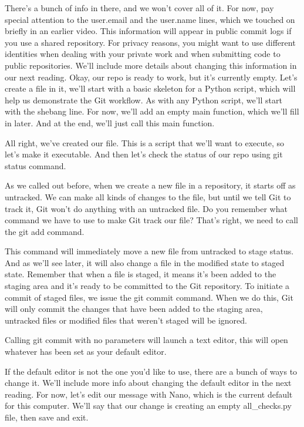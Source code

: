 	There's a bunch of info in there, and we won't cover all of it. For now, pay special attention to the user.email and the user.name lines, which we touched on briefly in an earlier video. This information will appear in public commit logs if you use a shared repository. For privacy reasons, you might want to use different identities when dealing with your private work and when submitting code to public repositories. We'll include more details about changing this information in our next reading. Okay, our repo is ready to work, but it's currently empty. Let's create a file in it, we'll start with a basic skeleton for a Python script, which will help us demonstrate the Git workflow. As with any Python script, we'll start with the shebang line. For now, we'll add an empty main function, which we'll fill in later. And at the end, we'll just call this main function.
	
	All right, we've created our file. This is a script that we'll want to execute, so let's make it executable. And then let's check the status of our repo using git status command.
	
	As we called out before, when we create a new file in a repository, it starts off as untracked. We can make all kinds of changes to the file, but until we tell Git to track it, Git won't do anything with an untracked file. Do you remember what command we have to use to make Git track our file? That's right, we need to call the git add command.
	
	This command will immediately move a new file from untracked to stage status. And as we'll see later, it will also change a file in the modified state to staged state. Remember that when a file is staged, it means it's been added to the staging area and it's ready to be committed to the Git repository. To initiate a commit of staged files, we issue the git commit command. When we do this, Git will only commit the changes that have been added to the staging area, untracked files or modified files that weren't staged will be ignored.
	
	Calling git commit with no parameters will launch a text editor, this will open whatever has been set as your default editor.
	
	If the default editor is not the one you'd like to use, there are a bunch of ways to change it. We'll include more info about changing the default editor in the next reading. For now, let's edit our message with Nano, which is the current default for this computer. We'll say that our change is creating an empty all_checks.py file, then save and exit.
	
